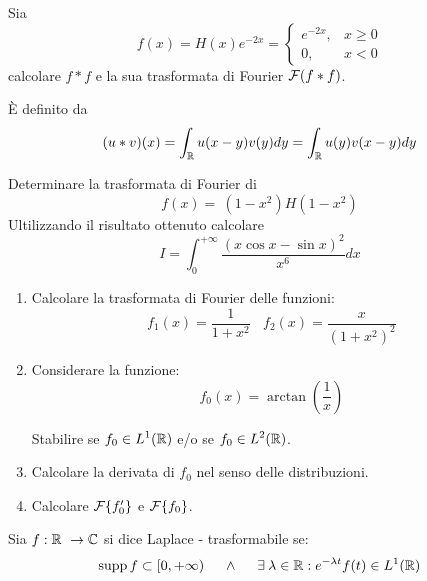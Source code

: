 Sia
\begin{equation*}
f(x) = H(x) e^{- 2x} = 
\begin{cases}
e^{- 2x}, & x \geq 0\\
0, & x < 0
\end{cases}
\end{equation*}
calcolare $\displaystyle f*f$ e la sua trasformata di Fourier $\displaystyle \mathcal{F} (f*f)$.
\begin{rem}
 È definito da
\begin{equation*}
(u*v)(x) = \int_{\mathbb{R}} u(x - y) v(y) dy = \int_{\mathbb{R}} u(y) v(x - y) dy
\end{equation*}
\end{rem}
\Esercizio{}

Determinare la trasformata di Fourier di
\begin{equation*}
f(x) = \ \left(1 - x^{2}\right) H\left(1 - x^{2}\right)
\end{equation*}
Ultilizzando il risultato ottenuto calcolare
\begin{equation*}
I = \int^{+ \infty}_{0}\frac{(x\cos x - \sin x)^{2}}{x^{6}} dx
\end{equation*}
\Esercizio{}
\begin{enumerate}
\item Calcolare la trasformata di Fourier delle funzioni:
\begin{equation*}
f_{1}(x) = \frac{1}{1 + x^{2}} \ \ \ \ f_{2}(x) = \frac{x}{\left(1 + x^{2}\right)^{2}}
\end{equation*}
\item Considerare la funzione:
\begin{equation*}
f_{0}(x) = \arctan\left(\frac{1}{x}\right)
\end{equation*}

Stabilire se $\displaystyle f_{0} \in L^{1}(\mathbb{R})$ e/o se $\displaystyle f_{0} \in L^{2}(\mathbb{R})$.
\item Calcolare la derivata di $\displaystyle f_{0}$ nel senso delle distribuzioni.
\item Calcolare $\mathcal{F} \{f'_{0}\}$ e $\mathcal{F} \{f_{0}\}$.
\end{enumerate}
\Esercizio{}
\begin{defn}
Sia $\displaystyle f:\mathbb{R}  \ \rightarrow \mathbb{C} $ si dice Laplace - trasformabile se:
\begin{equation*}
\supp f\subset [ 0, + \infty) \ \ \ \ \land \ \ \ \ \exists \lambda \in \RR  :e^{- \lambda t} f(t) \in L^{1}(\RR)
\end{equation*}
\end{defn}
